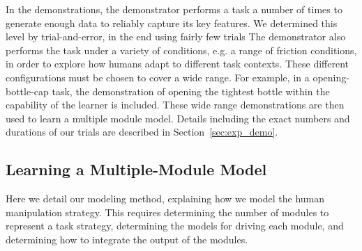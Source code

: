 
In the demonstrations, the demonstrator performs a task a number of
times to generate enough data to reliably capture its key features.
We determined this level by trial-and-error, in the end using fairly
few trials The demonstrator also performs the task under a variety of
conditions, e.g. a range of friction conditions, in order to explore
how humans adapt to different task contexts.   These different
configurations must be chosen to cover a wide range.%
For example, in a opening-bottle-cap task, the demonstration of opening
the tightest bottle within the capability of the learner is
included. These wide range demonstrations are then used to learn a
multiple module model. Details including the exact numbers and
durations of our trials are described in
Section~\ref{sec:exp_demo}. %



\subsection{Learning a Multiple-Module Model}
\label{sec:learn}
Here we detail our modeling method, explaining how we model the human
manipulation strategy.  This requires determining the number of modules to
represent a task strategy, determining the models for driving each
module, and determining how to integrate the output of the modules.

